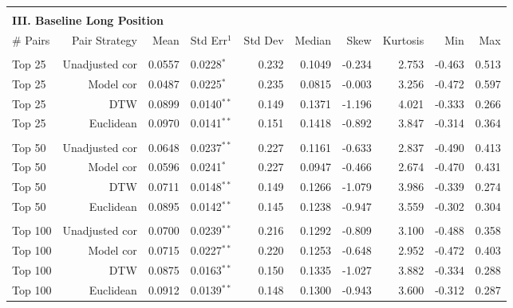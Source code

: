 \documentclass[12pt]{article}
\begin{document}
\begin{table}[hp]
\begin{tabular}{l r r l r r r r r r}
        \vspace{-1mm} \\
        \hline
        \vspace{1 mm} \\
        \multicolumn{9}{l}{\textbf{III. Baseline Long Position}} \\
        \# Pairs & Pair Strategy & Mean & Std Err{$^{1}$} & Std Dev & Median & Skew & Kurtosis & Min & Max \\
        \hline
        \vspace{-1mm} \\
        Top 25    & Unadjusted cor & 0.0557 & 0.0228{$^{*}$}  & 0.232 & 0.1049 & -0.234 & 2.753 & -0.463 & 0.513 \\
        Top 25    & Model cor      & 0.0487 & 0.0225{$^{*}$}  & 0.235 & 0.0815 & -0.003 & 3.256 & -0.472 & 0.597 \\
        Top 25    & DTW            & 0.0899 & 0.0140{$^{**}$} & 0.149 & 0.1371 & -1.196 & 4.021 & -0.333 & 0.266 \\
        Top 25    & Euclidean      & 0.0970 & 0.0141{$^{**}$} & 0.151 & 0.1418 & -0.892 & 3.847 & -0.314 & 0.364 \\
        \vspace{-1mm} \\
        Top 50    & Unadjusted cor & 0.0648 & 0.0237{$^{**}$} & 0.227 & 0.1161 & -0.633 & 2.837 & -0.490 & 0.413 \\
        Top 50    & Model cor      & 0.0596 & 0.0241{$^{*}$}  & 0.227 & 0.0947 & -0.466 & 2.674 & -0.470 & 0.431 \\
        Top 50    & DTW            & 0.0711 & 0.0148{$^{**}$} & 0.149 & 0.1266 & -1.079 & 3.986 & -0.339 & 0.274 \\
        Top 50    & Euclidean      & 0.0895 & 0.0142{$^{**}$} & 0.145 & 0.1238 & -0.947 & 3.559 & -0.302 & 0.304 \\
        \vspace{-1mm} \\
        Top 100   & Unadjusted cor & 0.0700 & 0.0239{$^{**}$} & 0.216 & 0.1292 & -0.809 & 3.100 & -0.488 & 0.358 \\
        Top 100   & Model cor      & 0.0715 & 0.0227{$^{**}$} & 0.220 & 0.1253 & -0.648 & 2.952 & -0.472 & 0.403 \\
        Top 100   & DTW            & 0.0875 & 0.0163{$^{**}$} & 0.150 & 0.1335 & -1.027 & 3.882 & -0.334 & 0.288 \\
        Top 100   & Euclidean      & 0.0912 & 0.0139{$^{**}$} & 0.148 & 0.1300 & -0.943 & 3.600 & -0.312 & 0.287 \\

\end{tabular}
\end{table}
\end{document}
